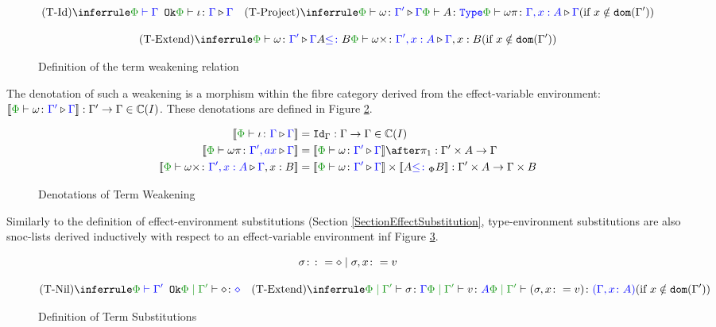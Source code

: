 \documentclass{Report}
\begin{document}
\begin{figure}[H]
    \centering
    \begin{framed}
        \[
            \ntreeruleI{\tid}{\wellformedok{\P}{\G}}{\pewrel{\i}{\G}{\G}}
            \quad  
            \condtreeruleII{\tproject}{\pewrel{\w}{\G'}{\G}}{\typerelation{\P}{A}{\type}}{\pewrel{\w \pi}{\G, x: A}{\G}}{x \notin \dom{\G'}}
        \]
        
        \[
            \condtreeruleII{\textend}{\pewrel{\w}{\G'}{\G}}{ A \subtype B}{\pewrel{\w \x}{\G', x: A}{\G, x: B}}{x \notin \dom{\G'}}
        \] 
    \end{framed}
    \caption{Definition of the term weakening relation}
    \label{TermWeakeningRelation}
\end{figure}


The denotation of such a weakening is a morphism within the fibre category derived from the effect-variable environment: $\deno{\pewrel{\w}{\G'}{\G}}: \G' \rightarrow \G \in \C(I)$. These denotations are defined in Figure \ref{TermWeakeningDenotations}.

\begin{figure}[H]
    \centering
    \begin{framed}
        \begin{align}
            \deno{\pewrel{\i}{\G}{\G}} &= \idg: \G \rightarrow \G \in \C(I)
            \\
            \deno{\pewrel{\w\pi}{\G', ax}{\G}} &= \deno{\pewrel{\w}{\G'}{\G}}\after\p: \G'\times A \rightarrow \G
            \\
            \deno{\pewrel{\w\x}{\G', x: A}{\G, x: B}} &= \deno{\pewrel{\w}{\G'}{\G}}\times \deno{A\subtypep B}: \G'\times A \rightarrow \G\times B
        \end{align}
        
    \end{framed}\caption{Denotations of Term Weakening}
    \label{TermWeakeningDenotations}
\end{figure}


Similarly to the definition of effect-environment substitutions (Section \ref{SectionEffectSubstitution}, type-environment substitutions are also snoc-lists derived inductively with respect to an effect-variable environment inf Figure \ref{TermSubstitutionDefinition}.

\begin{figure}[H]
    \centering
\begin{framed}
    
    \[
        \sigma\colon\colon=\diamond\mid\sigma,x\colon= v    
    \]

    \[
    \ntreeruleI{\tsubnil}{\wellformedok{\P}{\G'}}{\etyperelation{\P}{\G'}{\nil}{\nil}}
    \quad
    \condtreeruleII{\tsubextend}{
        \etyperelation{\P}{\G'}{\si}{\G}
    }{
        \etyperelation{\P}{\G'}{v}{A}
    }{
        \etyperelation{\P}{\G'}{(\si, x \setto v)}{(\gax)}
    }{x \notin \dom{\G'}}
\]
\end{framed}
    \caption{Definition of Term Substitutions}
    \label{TermSubstitutionDefinition}
\end{figure}
\end{document}
